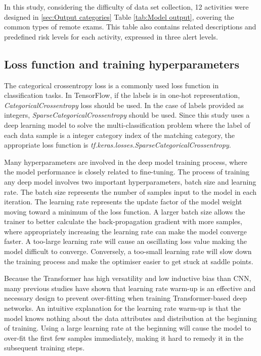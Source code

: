 In this study, considering the difficulty of data set collection, 12 activities were designed in \ref{sec:Output categories} Table \ref{tab:Model output}, covering the common types of remote exams.
This table also contains related descriptions and predefined risk levels for each activity, expressed in three alert levels.

\subsection{Loss function and training hyperparameters}
\label{subsec:Loss function and training hyperparameters}
The categorical crossentropy loss is a commonly used loss function in classification tasks.
In TensorFlow, if the labels is in one-hot representation, \textit{CategoricalCrossentropy} loss should be used.
In the case of labels provided as integers, \textit{SparseCategoricalCrossentropy} should be used.
Since this study uses a deep learning model to solve the multi-classification problem where the label of each data sample is a integer category index of the matching category, the appropriate loss function is \textit{tf.keras.losses.SparseCategoricalCrossentropy}.

Many hyperparameters are involved in the deep model training process, where the model performance is closely related to fine-tuning.
The process of training any deep model involves two important hyperparameters, batch size and learning rate.
The batch size represents the number of samples input to the model in each iteration.
The learning rate represents the update factor of the model weight moving toward a minimum of the loss function.
A larger batch size allows the trainer to better calculate the back-propagation gradient with more samples, where appropriately increasing the learning rate can make the model converge faster.
A too-large learning rate will cause an oscillating loss value making the model difficult to converge.
Conversely, a too-small learning rate will slow down the training process and make the optimiser easier to get stuck at saddle points.

Because the Transformer has high versatility and low inductive bias than CNN, many previous studies have shown that learning rate warm-up is an effective and necessary design to prevent over-fitting when training Transformer-based deep networks.
An intuitive explanation for the learning rate warm-up is that the model knows nothing about the data attributes and distribution at the beginning of training.
Using a large learning rate at the beginning will cause the model to over-fit the first few samples immediately, making it hard to remedy it in the subsequent training steps.

